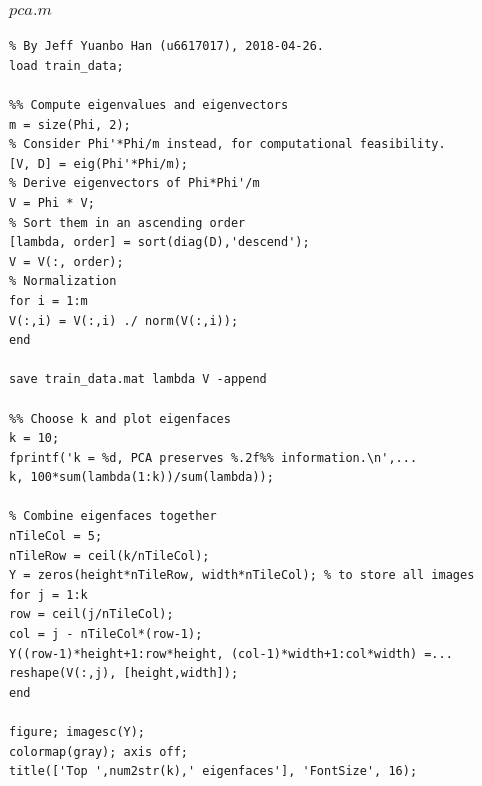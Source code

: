 \documentclass{article}
\theoremstyle{plain} \newtheorem{prop}{Proposition}
\begin{document}
\subsubsection{$pca.m$}
\label{code-2}
\begin{lstlisting}
% By Jeff Yuanbo Han (u6617017), 2018-04-26.
load train_data;

%% Compute eigenvalues and eigenvectors
m = size(Phi, 2);
% Consider Phi'*Phi/m instead, for computational feasibility.
[V, D] = eig(Phi'*Phi/m);
% Derive eigenvectors of Phi*Phi'/m
V = Phi * V;
% Sort them in an ascending order
[lambda, order] = sort(diag(D),'descend');
V = V(:, order);
% Normalization
for i = 1:m
V(:,i) = V(:,i) ./ norm(V(:,i));
end

save train_data.mat lambda V -append

%% Choose k and plot eigenfaces
k = 10;
fprintf('k = %d, PCA preserves %.2f%% information.\n',...
k, 100*sum(lambda(1:k))/sum(lambda));

% Combine eigenfaces together
nTileCol = 5;
nTileRow = ceil(k/nTileCol);
Y = zeros(height*nTileRow, width*nTileCol); % to store all images
for j = 1:k
row = ceil(j/nTileCol);
col = j - nTileCol*(row-1);
Y((row-1)*height+1:row*height, (col-1)*width+1:col*width) =...
reshape(V(:,j), [height,width]);
end

figure; imagesc(Y);
colormap(gray); axis off;
title(['Top ',num2str(k),' eigenfaces'], 'FontSize', 16);

\end{lstlisting}
\end{document}
